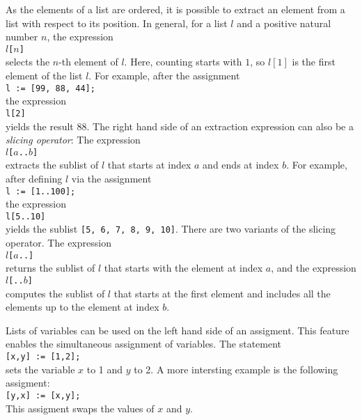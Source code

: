 As the elements of a list are ordered, it is possible to extract an element from a list with respect
to its position.  In general, for a list $l$ and a positive natural number $n$, the expression
\\[0.2cm]
\hspace*{1.3cm}
\texttt{$l$[$n$]}
\\[0.2cm]
selects the $n$-th element of $l$.  Here, counting starts with $1$, so $l[1]$ is the first element
of the list $l$.  For example, after the assignment
\\[0.2cm]
\hspace*{1.3cm}
\texttt{l := [99, 88, 44];}
\\[0.2cm]
the expression 
\\[0.2cm]
\hspace*{1.3cm}
\texttt{l[2]}
\\[0.2cm]
yields the result $88$.  The right hand side of an extraction expression can also be a \emph{slicing operator}:
The expression
\\[0.2cm]
\hspace*{1.3cm}
\texttt{$l$[$a$..$b$]}
\\[0.2cm]
extracts the sublist of $l$ that starts at index $a$ and ends at index $b$.  For example,
after defining $l$ via the assignment
\\[0.2cm]
\hspace*{1.3cm}
\texttt{l := [1..100];}
\\[0.2cm]
the expression
\\[0.2cm]
\hspace*{1.3cm}
\texttt{l[5..10]}
\\[0.2cm]
yields the sublist \texttt{[5, 6, 7, 8, 9, 10]}.  There are two variants of the slicing operator.
The expression
\\[0.2cm]
\hspace*{1.3cm}
\texttt{$l$[$a$..]}
\\[0.2cm]
returns the sublist of $l$ that starts with the element at index $a$, and the expression
\\[0.2cm]
\hspace*{1.3cm}
\texttt{$l$[..$b$]}
\\[0.2cm]
computes the sublist of $l$ that starts at the first element and includes all the elements up to the
element at index $b$.

Lists of variables can be used on the left hand side of an assigment.  This feature enables the
simultaneous assignment of variables.  The statement
\\[0.2cm]
\hspace*{1.3cm}
\texttt{[x,y] := [1,2];}
\\[0.2cm]
sets the variable $x$ to 1 and $y$ to 2.  A more intersting example is the following assigment:
\\[0.2cm]
\hspace*{1.3cm}
\texttt{[y,x] := [x,y];}
\\[0.2cm]
This assigment swaps the values of $x$ and $y$.

